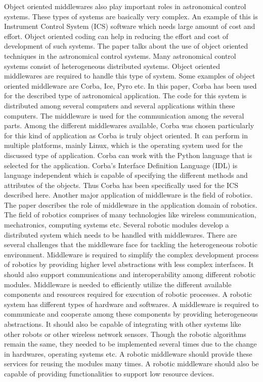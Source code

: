 \documentclass{acm_proc_article-sp}
\begin{document}
Object oriented middlewares also play important roles in astronomical control systems. These types of systems are basically very complex. An example of this is Instrument Control System (ICS) software which needs large amount of cost and effort. Object oriented coding can help in reducing the effort and cost of development of such systems. The paper \cite{Dipper:2004p565} talks about the use of object oriented techniques in the astronomical control systems. Many astronomical control systems consist of heterogeneous distributed systems. Object oriented middlewares are required to handle this type of system.
Some examples of object oriented middleware are Corba, Ice, Pyro etc. In this paper, Corba has been used for the described type of astronomical application. The code for this system is distributed among several computers and several applications within these computers. The middleware is used for the communication among the several parts. Among the different middlewares available, Corba was chosen particularly for this kind of application as Corba is truly object oriented. It can perform in multiple platforms, mainly Linux, which is the operating system used for the discussed type of application.  Corba can work with the Python language that is selected for the application. Corba’s Interface Definition Language (IDL) is language independent which is capable of specifying the different methods and attributes of the objects. Thus Corba has been specifically used for the ICS described here.
Another major application of middleware is the field of robotics. The paper \cite{Mohamed:2008p736} describes the role of middleware in the application domain of robotics. The field of robotics comprises of many technologies like wireless communication, mechatronics, computing systems etc. Several robotic modules develop a distributed system which needs to be handled with middlewares. There are several challenges that the middleware face for tackling the heterogeneous robotic environment. Middleware is required to simplify the complex development process of robotics by providing higher level abstractions with less complex interfaces. It should also support communications and interoperability among different robotic modules. Middleware is needed to efficiently utilize the different available components and resources required for execution of robotic processes. A robotic system has different types of hardware and softwares. A middleware is required to communicate and cooperate among these components by providing heterogeneous abstractions. It should also be capable of integrating with other systems like other robots or other wireless network sensors. Though the robotic algorithms remain the same, they needed to be implemented several times due to the change in hardwares, operating systems etc. A robotic middleware should provide these services for reusing the modules many times.  A robotic middleware should also be capable of providing functionalities to support low resource devices. 
\end{document}
